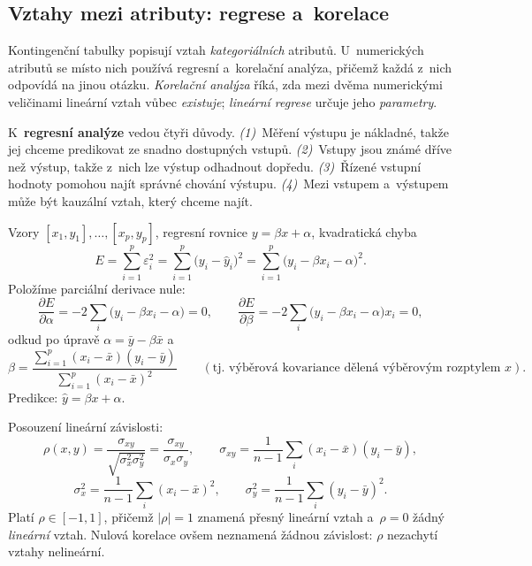 \documentclass[11pt,a4paper]{article}
\theoremstyle{definition}
\begin{document}
\subsection{Vztahy mezi atributy: regrese a~korelace}

Kontingenční tabulky popisují vztah \emph{kategoriálních} atributů. U~numerických atributů se
místo nich používá regresní a~korelační analýza, přičemž každá z~nich odpovídá na jinou
otázku. \emph{Korelační analýza} říká, zda mezi dvěma numerickými veličinami lineární vztah
vůbec \emph{existuje}; \emph{lineární regrese} určuje jeho \emph{parametry}.

K~\textbf{regresní analýze} vedou čtyři důvody. \emph{(1)}~Měření výstupu je nákladné, takže
jej chceme predikovat ze snadno dostupných vstupů. \emph{(2)}~Vstupy jsou známé dříve než
výstup, takže z~nich lze výstup odhadnout dopředu. \emph{(3)}~Řízené vstupní hodnoty pomohou
najít správné chování výstupu. \emph{(4)}~Mezi vstupem a~výstupem může být kauzální vztah,
který chceme najít.

\begin{defbox}
Vzory $[x_1,y_1],\dots,[x_p,y_p]$, regresní rovnice $y=\beta x+\alpha$, kvadratická chyba
\[ E=\sum_{i=1}^{p}\varepsilon_i^2=\sum_{i=1}^{p}\big(y_i-\hat y_i\big)^2
   =\sum_{i=1}^{p}\big(y_i-\beta x_i-\alpha\big)^2. \]
Položíme parciální derivace nule:
\[ \frac{\partial E}{\partial\alpha}=-2\sum_i\big(y_i-\beta x_i-\alpha\big)=0,\qquad
   \frac{\partial E}{\partial\beta}=-2\sum_i\big(y_i-\beta x_i-\alpha\big)x_i=0, \]
odkud po úpravě $\alpha=\bar y-\beta\bar x$ a
\[ \beta=\frac{\sum_{i=1}^{p}(x_i-\bar x)(y_i-\bar y)}{\sum_{i=1}^{p}(x_i-\bar x)^2}
   \qquad(\text{tj.\ výběrová kovariance dělená výběrovým rozptylem }x). \]
Predikce: $\hat y=\beta x+\alpha$.
\end{defbox}

\begin{defbox}
Posouzení  lineární závislosti:
\[ \rho(x,y)=\frac{\sigma_{xy}}{\sqrt{\sigma_x^2\sigma_y^2}}=\frac{\sigma_{xy}}{\sigma_x\sigma_y},
\qquad
\sigma_{xy}=\frac{1}{n-1}\sum_i (x_i-\bar x)(y_i-\bar y), \]
\[ \sigma_x^2=\frac{1}{n-1}\sum_i (x_i-\bar x)^2,\qquad
   \sigma_y^2=\frac{1}{n-1}\sum_i (y_i-\bar y)^2. \]
Platí $\rho\in[-1,1]$, přičemž $|\rho|=1$ znamená přesný lineární vztah a~$\rho=0$ žádný
\emph{lineární} vztah. Nulová korelace ovšem neznamená žádnou závislost: $\rho$ nezachytí
vztahy nelineární.
\end{defbox}
\end{document}
